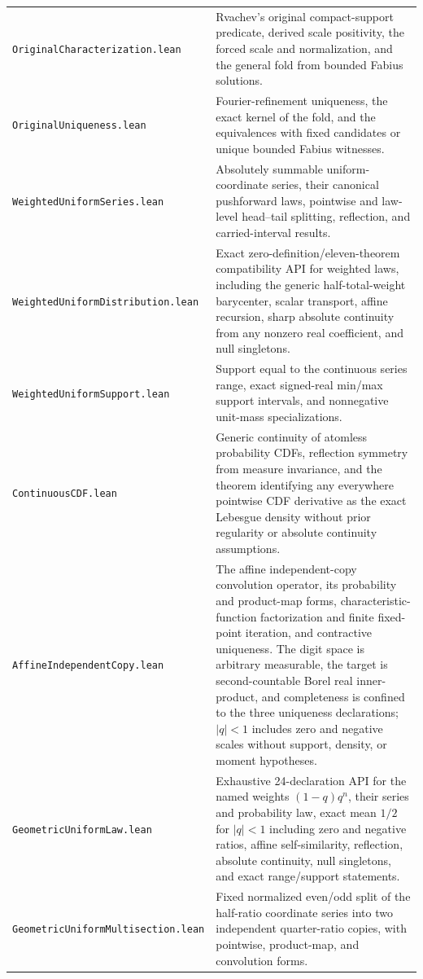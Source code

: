 \documentclass[11pt,oneside]{article}
\theoremstyle{definition}
\theoremstyle{remark}
\begin{document}
\begin{longtable}{>{\raggedright\arraybackslash}p{} >{\raggedright\arraybackslash}p{}}
\nolinkurl{OriginalCharacterization.lean} & Rvachev's original compact-support predicate, derived scale positivity, the forced scale and normalization, and the general fold from bounded Fabius solutions. \\
\nolinkurl{OriginalUniqueness.lean} & Fourier-refinement uniqueness, the exact kernel of the fold, and the equivalences with fixed candidates or unique bounded Fabius witnesses. \\
\nolinkurl{WeightedUniformSeries.lean} & Absolutely summable uniform-coordinate series, their canonical pushforward laws, pointwise and law-level head--tail splitting, reflection, and carried-interval results. \\
\nolinkurl{WeightedUniformDistribution.lean} & Exact zero-definition/eleven-theorem compatibility API for weighted laws, including the generic half-total-weight barycenter, scalar transport, affine recursion, sharp absolute continuity from any nonzero real coefficient, and null singletons. \\
\nolinkurl{WeightedUniformSupport.lean} & Support equal to the continuous series range, exact signed-real min/max support intervals, and nonnegative unit-mass specializations. \\
\nolinkurl{ContinuousCDF.lean} & Generic continuity of atomless probability CDFs, reflection symmetry from measure invariance, and the theorem identifying any everywhere pointwise CDF derivative as the exact Lebesgue density without prior regularity or absolute continuity assumptions. \\
\nolinkurl{AffineIndependentCopy.lean} & The affine independent-copy convolution operator, its probability and product-map forms, characteristic-function factorization and finite fixed-point iteration, and contractive uniqueness.  The digit space is arbitrary measurable, the target is second-countable Borel real inner-product, and completeness is confined to the three uniqueness declarations; \(\lvert q\rvert<1\) includes zero and negative scales without support, density, or moment hypotheses. \\
\nolinkurl{GeometricUniformLaw.lean} & Exhaustive 24-declaration API for the named weights \((1-q)q^n\), their series and probability law, exact mean \(1/2\) for \(\lvert q\rvert<1\) including zero and negative ratios, affine self-similarity, reflection, absolute continuity, null singletons, and exact range/support statements. \\
\nolinkurl{GeometricUniformMultisection.lean} & Fixed normalized even/odd split of the half-ratio coordinate series into two independent quarter-ratio copies, with pointwise, product-map, and convolution forms. \\

\end{longtable}
\end{document}
